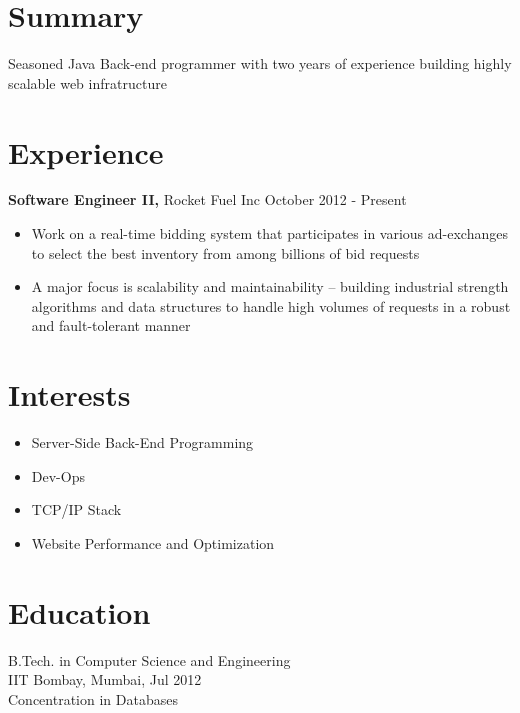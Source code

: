 \documentclass[margin]{res}
\begin{document}

\address{ \href{http://ankush.io/}{http://ankush.io} }
\address{ ankush@ankush.io }

\begin{resume}

\section{Summary}
  Seasoned Java Back-end programmer with two years of experience building highly scalable web infratructure

\section{Experience}
 {\bf Software Engineer II,} Rocket Fuel Inc \hfill October 2012 - Present
 \begin{itemize} \itemsep -2pt  %
 \item Work on a real-time bidding system that participates in various ad-exchanges to select the best inventory from among billions of bid requests
 \item A major focus is scalability and maintainability -- building industrial strength algorithms and data structures to handle high volumes of requests in a robust and fault-tolerant manner

 \end{itemize}


\section{Interests}
 \begin{itemize} \itemsep -2pt  %
 \item Server-Side Back-End Programming
 \item Dev-Ops
 \item TCP/IP Stack
 \item Website Performance and Optimization
 \end{itemize}


\section{Education}
B.Tech. in Computer Science and Engineering \\
IIT Bombay, Mumbai, Jul 2012 \\
Concentration in Databases




\end{resume}
\end{document}

